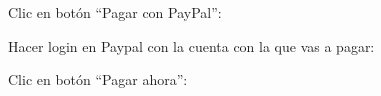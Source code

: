 \documentclass[12pt, spanish]{article}
\begin{document}
\begin{steps}
        \item Clic en botón ``Pagar con PayPal'':

            \medskip
            \begin{minipage}[t]{\linewidth}
            \raggedright
        \end{minipage}

        \item Hacer login en Paypal con la cuenta con la que vas a pagar:

            \medskip
            \begin{minipage}[t]{\linewidth}
            \raggedright
        \end{minipage}

        \item Clic en botón ``Pagar ahora'':


\end{steps}
\end{document}
